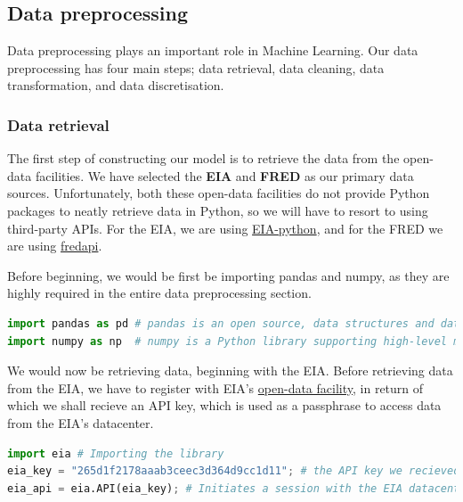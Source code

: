 \hypertarget{data-preprocessing}{%
\subsection{Data preprocessing}\label{data-preprocessing}}

Data preprocessing plays an important role in Machine Learning. Our data
preprocessing has four main steps; data retrieval, data cleaning, data
transformation, and data discretisation.

\hypertarget{data-retrieval}{%
\subsubsection{Data retrieval}\label{data-retrieval}}

The first step of constructing our model is to retrieve the data from
the open-data facilities. We have selected the \textbf{EIA} and
\textbf{FRED} as our primary data sources. Unfortunately, both these
open-data facilities do not provide Python packages to neatly retrieve
data in Python, so we will have to resort to using third-party APIs. For
the EIA, we are using
\href{https://github.com/mra1385/EIA-python/}{EIA-python}, and for the
FRED we are using \href{https://github.com/mortada/fredapi}{fredapi}.

Before beginning, we would be first be importing pandas and numpy, as
they are highly required in the entire data preprocessing section.

\begin{lstlisting}[language=Python]
import pandas as pd # pandas is an open source, data structures and data analysis tool in Python
import numpy as np  # numpy is a Python library supporting high-level mathematical functions on large multidimensional arrays
\end{lstlisting}

We would now be retrieving data, beginning with the EIA. Before
retrieving data from the EIA, we have to register with EIA's
\href{https://www.eia.gov/opendata/}{open-data facility}, in return of
which we shall recieve an API key, which is used as a passphrase to
access data from the EIA's datacenter.

\begin{lstlisting}[language=Python]
import eia # Importing the library
eia_key = "265d1f2178aaab3ceec3d364d9cc1d11"; # the API key we recieved from EIA
eia_api = eia.API(eia_key); # Initiates a session with the EIA datacenter to recieve datasets
\end{lstlisting}

